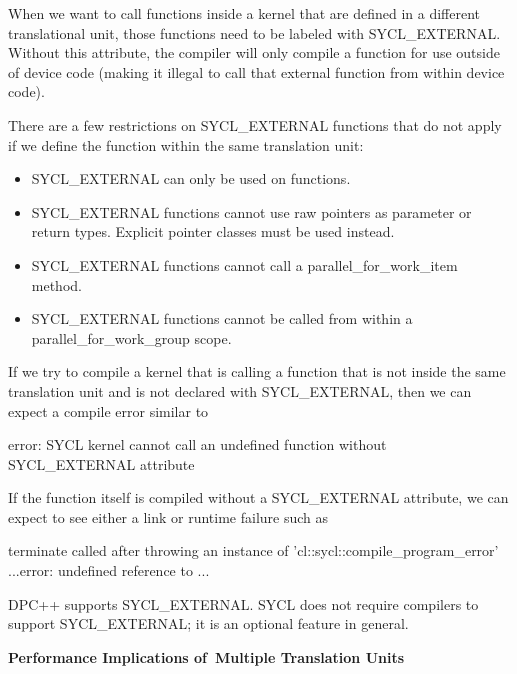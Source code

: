 When we want to call functions inside a kernel that are defined in a different translational unit, those functions need to be labeled with SYCL\_EXTERNAL. Without this attribute, the compiler will only compile a function for use outside of device code (making it illegal to call that external function from within device code).\par

There are a few restrictions on SYCL\_EXTERNAL functions that do not apply if we define the function within the same translation unit:\par

\begin{itemize}
	\item SYCL\_EXTERNAL can only be used on functions.
	\item SYCL\_EXTERNAL functions cannot use raw pointers as parameter or return types. Explicit pointer classes must be used instead.
	\item SYCL\_EXTERNAL functions cannot call a parallel\_for\_work\_item method.
	\item SYCL\_EXTERNAL functions cannot be called from within a parallel\_for\_work\_group scope.
\end{itemize}

If we try to compile a kernel that is calling a function that is not inside the same translation unit and is not declared with SYCL\_EXTERNAL, then we can expect a compile error similar to\par

\begin{tcolorbox}[colback=white,colframe=black]
error: SYCL kernel cannot call an undefined function without SYCL\_EXTERNAL attribute
\end{tcolorbox}

If the function itself is compiled without a SYCL\_EXTERNAL attribute, we can expect to see either a link or runtime failure such as\par

\begin{tcolorbox}[colback=white,colframe=black]
terminate called after throwing an instance of 'cl::sycl::compile\_program\_error' ...error: undefined reference to ...
\end{tcolorbox}

DPC++ supports SYCL\_EXTERNAL. SYCL does not require compilers to support SYCL\_EXTERNAL; it is an optional feature in general.\par

\hspace*{\fill} \par %
\textbf{Performance Implications of Multiple Translation Units}

